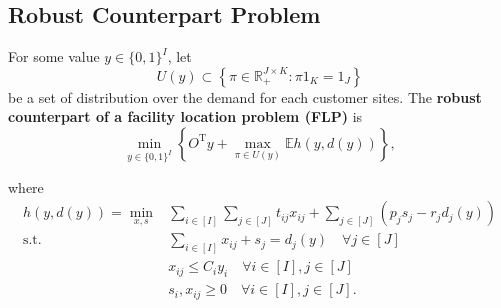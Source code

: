 \documentclass{beamer}
\newcommand{\R}{\mathbb{R}}
\newcommand{\T}{\mathrm{T}}
\newcommand{\E}{\mathbb{E}}
\begin{document}
\subsection{Robust Counterpart Problem}
\begin{frame}[allowframebreaks]
	\begin{definition}
		For some value $y \in \{0, 1\}^{I}$, let
		\begin{equation*}
			U(y) \subset \left\{\pi \in \R_+^{J \times K}: \pi 1_K = 1_J\right\}
		\end{equation*}
		be a set of distribution over the demand for each customer sites. The \textbf{robust counterpart of a facility location problem (FLP)} is
		\begin{equation} \label{eq:outterproblem}
			\min_{y \in \{0, 1\}^I} \left\{O^\T y + \max_{\pi \in U(y)} \E h(y, d(y))\right\},
		\end{equation}
	\end{definition}
	
	\framebreak
	\begin{definition}
		where
		\begin{subequations}
			\label{eq:innerproblem}
			\begin{align}
				h(y, d(y)) = \min_{x, s} &\sum_{i \in [I]} \sum_{j \in [J]} t_{ij}x_{ij} + \sum_{j \in [J]} (p_j s_j - r_j d_j(y)) \\
				\text{s.t.} &\sum_{i \in [I]} x_{ij} + s_j = d_j(y) \quad \forall j \in [J] \\
				&x_{ij} \le C_i y_i \quad \forall i \in [I], j \in [J] \\
				&s_i, x_{ij} \ge 0 \quad \forall i \in [I], j \in [J].
			\end{align}
		\end{subequations}
	\end{definition}
\end{frame}
\end{document}
